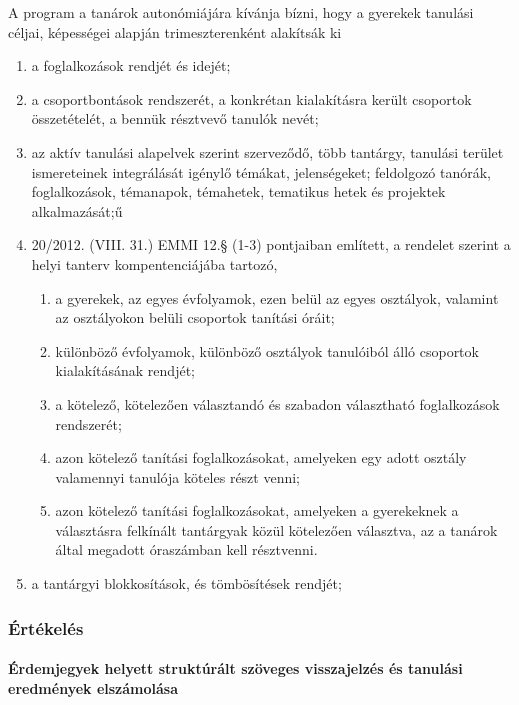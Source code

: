 \documentclass{article}
\providecommand{\tightlist}{%
  \setlength{\itemsep}{0pt}\setlength{\parskip}{0pt}}
\begin{document}
A program a tanárok autonómiájára kívánja bízni, hogy a gyerekek
tanulási céljai, képességei alapján trimeszterenként alakítsák ki

\begin{enumerate}
\def\labelenumi{\arabic{enumi}.}
\tightlist
\item
  a foglalkozások rendjét és idejét;
\item
  a csoportbontások rendszerét, a konkrétan kialakításra került
  csoportok összetételét, a bennük résztvevő tanulók nevét;
\item
  az aktív tanulási alapelvek szerint szerveződő, több tantárgy,
  tanulási terület ismereteinek integrálását igénylő témákat,
  jelenségeket; feldolgozó tanórák, foglalkozások, témanapok, témahetek,
  tematikus hetek és projektek alkalmazását;ű
\item
  20/2012. (VIII. 31.) EMMI 12.§ (1-3) pontjaiban említett, a rendelet
  szerint a helyi tanterv kompentenciájába tartozó,

  \begin{enumerate}
  \def\labelenumii{\arabic{enumii}.}
  \tightlist
  \item
    a gyerekek, az egyes évfolyamok, ezen belül az egyes osztályok,
    valamint az osztályokon belüli csoportok tanítási óráit;
  \item
    különböző évfolyamok, különböző osztályok tanulóiból álló csoportok
    kialakításának rendjét;
  \item
    a kötelező, kötelezően választandó és szabadon választható
    foglalkozások rendszerét;
  \item
    azon kötelező tanítási foglalkozásokat, amelyeken egy adott osztály
    valamennyi tanulója köteles részt venni;
  \item
    azon kötelező tanítási foglalkozásokat, amelyeken a gyerekeknek a
    választásra felkínált tantárgyak közül kötelezően választva, az a
    tanárok által megadott óraszámban kell résztvenni.
  \end{enumerate}
\item
  a tantárgyi blokkosítások, és tömbösítések rendjét;
\end{enumerate}

\hypertarget{ertekeles}{%
\subsubsection{Értékelés}\label{ertekeles}}

\hypertarget{erdemjegyek-helyett-strukturalt-szoveges-visszajelzes-es-tanulasi-eredmenyek-elszamolasa}{%
\paragraph{Érdemjegyek helyett struktúrált szöveges visszajelzés és
tanulási eredmények
elszámolása}\label{erdemjegyek-helyett-strukturalt-szoveges-visszajelzes-es-tanulasi-eredmenyek-elszamolasa}}
\end{document}
